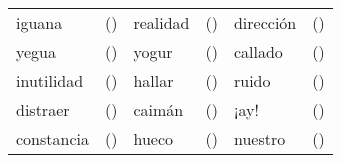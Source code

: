 \documentclass[12pt]{exam}
\begin{document}
	\begin{tabular}{lclclc}
		\hspace{20mm} iguana		&	\hspace{5mm}(\hspace{2mm})	\hspace{5mm} & realidad	    & \hspace{5mm}(\hspace{2mm}) \hspace{5mm} & dirección	& \hspace{5mm}(\hspace{2mm})\\
		\hspace{20mm} yegua			&	\hspace{5mm}(\hspace{2mm})	\hspace{5mm} & yogur		& \hspace{5mm}(\hspace{2mm}) \hspace{5mm} & callado		& \hspace{5mm}(\hspace{2mm})\\
		\hspace{20mm} inutilidad	&	\hspace{5mm}(\hspace{2mm})	\hspace{5mm} & hallar	    & \hspace{5mm}(\hspace{2mm}) \hspace{5mm} & ruido		& \hspace{5mm}(\hspace{2mm})\\
		\hspace{20mm} distraer		&	\hspace{5mm}(\hspace{2mm})	\hspace{5mm} & caimán	    & \hspace{5mm}(\hspace{2mm}) \hspace{5mm} & ¡ay!		& \hspace{5mm}(\hspace{2mm})\\
		\hspace{20mm} constancia	&	\hspace{5mm}(\hspace{2mm})	\hspace{5mm} & hueco		& \hspace{5mm}(\hspace{2mm}) \hspace{5mm} & nuestro		& \hspace{5mm}(\hspace{2mm})\\
	\end{tabular}
\end{document}

